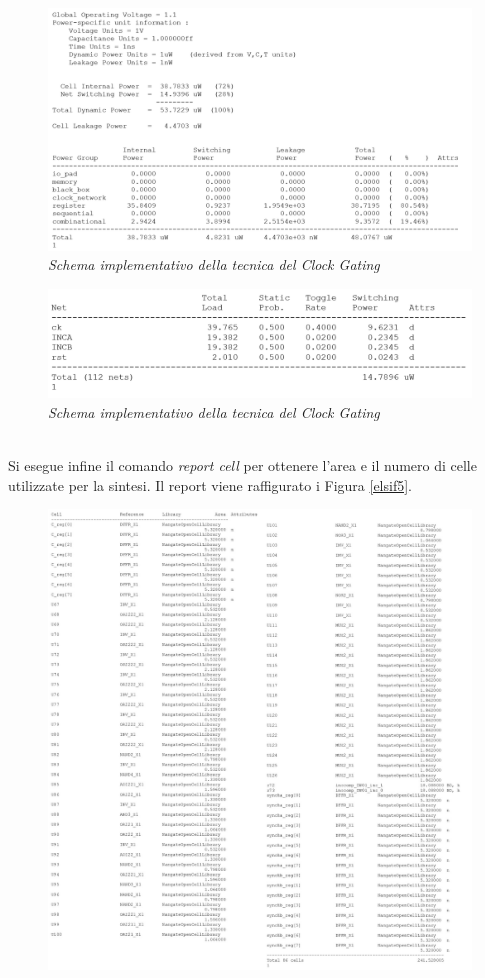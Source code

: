 {\begin{figure}[!htb]
	\centering
	\includegraphics[scale=0.65]{immagini/elsif1}
	\caption{\textit{Schema implementativo della tecnica del Clock Gating}}
	\label{elsif3}
\end{figure}
\begin{figure}[!htb]
	\centering
	\includegraphics[scale=0.65]{immagini/elsif2}
	\caption{\textit{Schema implementativo della tecnica del Clock Gating}}
	\label{elsif4}
\end{figure}
\\
Si esegue infine il comando \textit{report cell} per ottenere l'area e il numero di celle utilizzate per la sintesi. Il report viene raffigurato i Figura \ref{elsif5}. \\
\newpage
\begin{figure}[!htb]
	\centering
	\includegraphics[scale=0.28]{immagini/elsif5}

\end{figure}}
